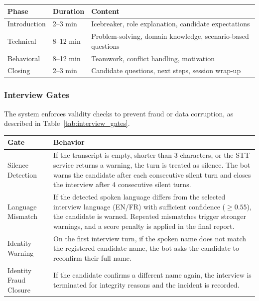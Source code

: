 \begin{center}
\label{tab:interview_phases}
\renewcommand{\arraystretch}{0.8}

\begin{tabularx}{\textwidth}{|p{3cm}|p{3cm}|X|}
\hline
\rowcolor{gray!20} \textbf{Phase} & \textbf{Duration} & \textbf{Content} \\
\hline
Introduction & 2--3 min & Icebreaker, role explanation, candidate expectations \\
\hline
Technical & 8--12 min & Problem-solving, domain knowledge, scenario-based questions \\
\hline
Behavioral & 8--12 min & Teamwork, conflict handling, motivation \\
\hline
Closing & 2--3 min & Candidate questions, next steps, session wrap-up \\
\hline
\end{tabularx}
\end{center}

\subsubsection{Interview Gates}

The system enforces validity checks to prevent fraud or data corruption, as described in Table~\ref{tab:interview_gates}.

\begin{center}
\label{tab:interview_gates}
\renewcommand{\arraystretch}{1.2}
\begin{tabularx}{\textwidth}{|p{3.5cm}|X|}
\hline
\rowcolor{gray!20} \textbf{Gate} & \textbf{Behavior} \\
\hline
Silence Detection &
If the transcript is empty, shorter than 3 characters, or the STT service returns a warning, the turn is treated as silence. The bot warns the candidate after each consecutive silent turn and closes the interview after 4 consecutive silent turns. \\
\hline
Language Mismatch &
If the detected spoken language differs from the selected interview language (EN/FR) with sufficient confidence ($\geq 0.55$), the candidate is warned. Repeated mismatches trigger stronger warnings, and a score penalty is applied in the final report. \\
\hline
Identity Warning &
On the first interview turn, if the spoken name does not match the registered candidate name, the bot asks the candidate to reconfirm their full name. \\
\hline
Identity Fraud Closure &
If the candidate confirms a different name again, the interview is terminated for integrity reasons and the incident is recorded. \\
\hline
\end{tabularx}
\end{center}

